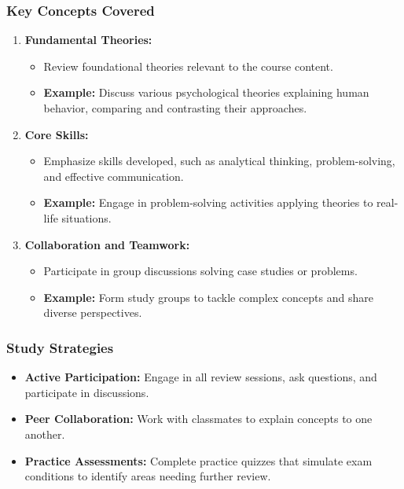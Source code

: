\documentclass[aspectratio=169]{beamer}
\begin{document}
\begin{frame}[fragile]
    \frametitle{Key Concepts Covered}
    \begin{enumerate}
        \item \textbf{Fundamental Theories:}
          \begin{itemize}
              \item Review foundational theories relevant to the course content.
              \item \textbf{Example:} Discuss various psychological theories explaining human behavior, comparing and contrasting their approaches.
          \end{itemize}
        
        \item \textbf{Core Skills:}
          \begin{itemize}
              \item Emphasize skills developed, such as analytical thinking, problem-solving, and effective communication.
              \item \textbf{Example:} Engage in problem-solving activities applying theories to real-life situations.
          \end{itemize}
        
        \item \textbf{Collaboration and Teamwork:}
          \begin{itemize}
              \item Participate in group discussions solving case studies or problems.
              \item \textbf{Example:} Form study groups to tackle complex concepts and share diverse perspectives.
          \end{itemize}
    \end{enumerate}
\end{frame}

\begin{frame}[fragile]
    \frametitle{Study Strategies}
    \begin{itemize}
        \item \textbf{Active Participation:} Engage in all review sessions, ask questions, and participate in discussions.
        
        \item \textbf{Peer Collaboration:} Work with classmates to explain concepts to one another.
        
        \item \textbf{Practice Assessments:} Complete practice quizzes that simulate exam conditions to identify areas needing further review.
    \end{itemize}
\end{frame}
\end{document}
